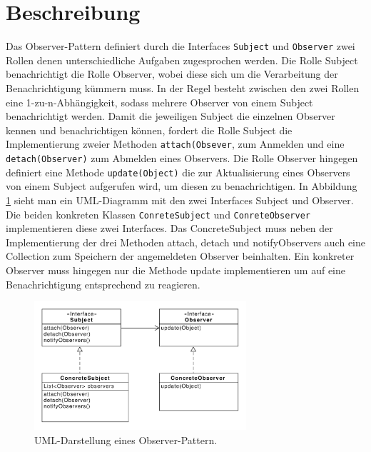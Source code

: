 \section{Beschreibung}
Das Observer-Pattern definiert durch die Interfaces \texttt{Subject} und \texttt{Observer} zwei Rollen denen unterschiedliche Aufgaben zugesprochen werden. Die Rolle Subject benachrichtigt die Rolle Observer, wobei diese sich um die Verarbeitung der Benachrichtigung kümmern muss. In der Regel besteht zwischen den zwei Rollen eine 1-zu-n-Abhängigkeit, sodass mehrere Observer von einem Subject benachrichtigt werden.
Damit die jeweiligen Subject die einzelnen Observer kennen und benachrichtigen können, fordert die Rolle Subject die Implementierung zweier Methoden \texttt{attach(Obsever}, zum Anmelden  und eine \texttt{detach(Observer)} zum Abmelden eines Observers.
Die Rolle Observer hingegen definiert eine Methode \texttt{update(Object)} die zur Aktualisierung eines Observers von einem Subject aufgerufen wird, um diesen zu benachrichtigen.
In Abbildung \ref{observerdiagramm} sieht man ein UML-Diagramm mit den zwei Interfaces Subject und Observer. Die beiden konkreten Klassen \texttt{ConreteSubject} und \texttt{ConreteObserver} implementieren diese zwei Interfaces. Das ConcreteSubject muss neben der Implementierung der drei Methoden attach, detach und notifyObservers auch eine Collection zum Speichern der angemeldeten Observer beinhalten. Ein konkreter Observer muss hingegen nur die Methode update implementieren um auf eine Benachrichtigung entsprechend zu reagieren.

\begin{figure}[h!]
\centering
\includegraphics[width=0.7\textwidth]{./paper/observer/observer}
\caption{UML-Darstellung eines Observer-Pattern.}
\label{observerdiagramm}
\end{figure} 
